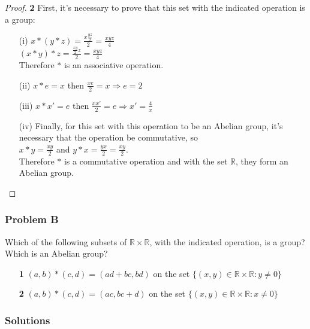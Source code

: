 \documentclass[11pt]{article}
\begin{document}
		\begin{proof}{\textbf{2}}
		First, it's necessary to prove that this set with the indicated operation is a group:
		\begin{itemize}
			\item [(i)] $x*(y*z)= \frac{x\frac{yz}{2}}{2}=\frac{xyz}{4}$ \\
			$(x*y)*z= \frac{\frac{xy}{2}z}{2}=\frac{xyz}{4}$ \\
			Therefore $*$ is an associative operation.
			\item [(ii)] $x*e=x$ then $\frac{xe}{2}=x \Rightarrow e=2$
			\item [(iii)] $x*x'=e$ then $\frac{xx'}{2}=e \Rightarrow x'=\frac{4}{x}$
			\item [(iv)] Finally, for this set with this operation to be an Abelian group, it's necessary that the operation be commutative, so \\
			$x*y =\frac{xy}{2}$ and $y*x=\frac{yx}{2}=\frac{xy}{2}$.\\
			Therefore $*$ is a commutative operation and with the set $\mathbb{R}$, they form an Abelian group.
		\end{itemize}
		\end{proof} 

	\subsubsection*{Problem B}
	Which of the following subsets of $\mathbb{R} \times \mathbb{R}$, with the indicated operation, is a group? Which is an Abelian group?
		\begin{itemize}
			\item [\textbf{1}] $(a,b)*(c,d)=(ad+bc,bd)$ on the set $\{(x,y) \in \mathbb{R} \times \mathbb{R}: y \neq 0\}$
			\item [\textbf{2}] $(a,b)*(c,d)=(ac,bc+d)$ on the set $\{(x,y) \in \mathbb{R} \times \mathbb{R}: x \neq 0\}$
		\end{itemize}
	
	\subsubsection*{Solutions}
	
\end{document}
